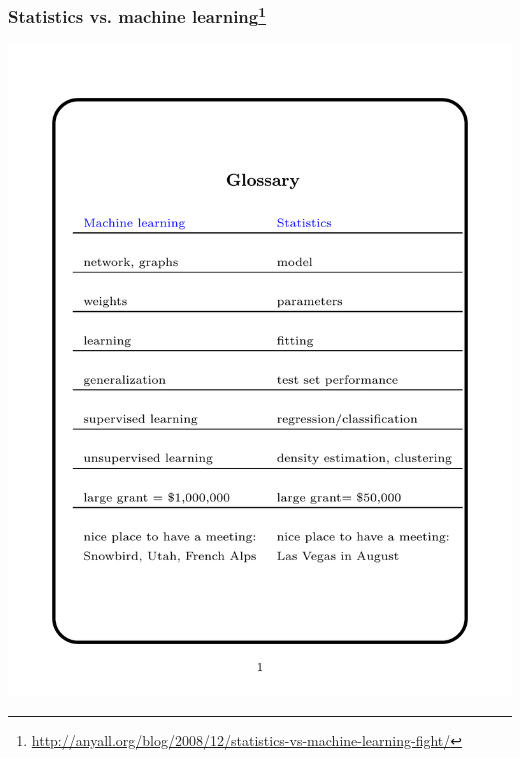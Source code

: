 \documentclass[xcolor=dvipsnames, 9pt]{beamer}
\begin{document}
\begin{frame}
  \frametitle{Statistics vs. machine learning\footnote{\url{http://anyall.org/blog/2008/12/statistics-vs-machine-learning-fight/}}}

    \begin{center}
      \includegraphics[height=0.825\textheight]{stat_vs_ml.pdf}
    \end{center}

\end{frame}
\end{document}
